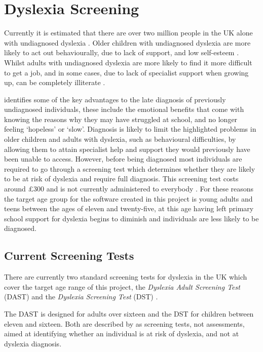 \documentclass[journal]{IEEEtran}
\begin{document}
\section{Dyslexia Screening}
\label{sec:screening}
Currently it is estimated that there are over two million people in the UK alone with undiagnosed dyslexia \cite{twomillion}. Older children with undiagnosed dyslexia are more likely to act out behaviourally, due to lack of support, and low self-esteem \cite{behaviour}. Whilst adults with undiagnosed dyslexia are more likely to find it more difficult to get a job, and in some cases, due to lack of specialist support when growing up, can be completely illiterate \cite{bda}. 

\cite{managing_at_uni} identifies some of the key advantages to the late diagnosis of previously undiagnosed individuals, these include the emotional benefits that come with knowing the reasons why they may have struggled at school, and no longer feeling `hopeless' or `slow'. Diagnosis is likely to limit the highlighted problems in older children and adults with dyslexia, such as behavioural difficulties, by allowing them to attain specialist help and support they would previously have been unable to access. However, before being diagnosed most individuals are required to go through a screening test which determines whether they are likely to be at risk of dyslexia and require full diagnosis. This screening test costs around \pounds 300 and is not currently administered to everybody \cite{bda}. For these reasons the target age group for the software created in this project is young adults and teens between the ages of eleven and twenty-five, at this age having left primary school support for dyslexia begins to diminish and individuals are less likely to be diagnosed\cite{DetectAndManage}.

\subsection{Current Screening Tests}
\label{sec:currentscreeningtests}
There are currently two standard screening tests for dyslexia in the UK which cover the target age range of this project, the \textit{Dyslexia Adult Screening Test} (DAST) and the \textit{Dyslexia  Screening Test} (DST) \cite{bda, dast}. 

The DAST is designed for adults over sixteen and the DST for children between eleven and sixteen. Both are described by \cite{dast} as screening tests, not assessments, aimed at identifying whether an individual is at risk of dyslexia, and not at dyslexia diagnosis. 
\end{document}
